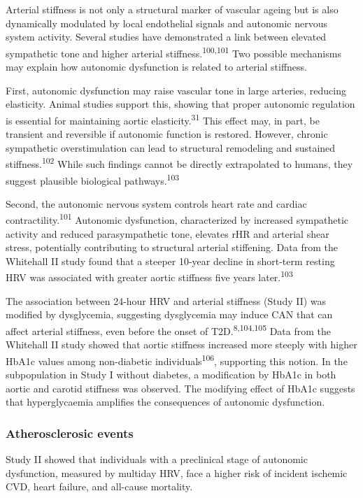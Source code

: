 \documentclass[
  a4paper,
  headsepline=true,
  open=left]{scrbook}
\begin{document}
Arterial stiffness is not only a structural marker of vascular ageing
but is also dynamically modulated by local endothelial signals and
autonomic nervous system activity. Several studies have demonstrated a
link between elevated sympathetic tone and higher arterial
stiffness.\textsuperscript{100,101} Two possible mechanisms may explain
how autonomic dysfunction is related to arterial stiffness.

First, autonomic dysfunction may raise vascular tone in large arteries,
reducing elasticity. Animal studies support this, showing that proper
autonomic regulation is essential for maintaining aortic
elasticity.\textsuperscript{31} This effect may, in part, be transient
and reversible if autonomic function is restored. However, chronic
sympathetic overstimulation can lead to structural remodeling and
sustained stiffness.\textsuperscript{102} While such findings cannot be
directly extrapolated to humans, they suggest plausible biological
pathways.\textsuperscript{103}

Second, the autonomic nervous system controls heart rate and cardiac
contractility.\textsuperscript{101} Autonomic dysfunction, characterized
by increased sympathetic activity and reduced parasympathetic tone,
elevates rHR and arterial shear stress, potentially contributing to
structural arterial stiffening. Data from the Whitehall II study found
that a steeper 10-year decline in short-term resting HRV was associated
with greater aortic stiffness five years later.\textsuperscript{103}

The association between 24-hour HRV and arterial stiffness (Study II)
was modified by dysglycemia, suggesting dysglycemia may induce CAN that
can affect arterial stiffness, even before the onset of
T2D.\textsuperscript{8,104,105} Data from the Whitehall II study showed
that aortic stiffness increased more steeply with higher HbA1c values
among non-diabetic individuals\textsuperscript{106}, supporting this
notion. In the subpopulation in Study I without diabetes, a modification
by HbA1c in both aortic and carotid stiffness was observed. The
modifying effect of HbA1c suggests that hyperglycaemia amplifies the
consequences of autonomic dysfunction.

\hypertarget{atherosclerosic-events}{%
\subsubsection{Atherosclerosic events}\label{atherosclerosic-events}}

Study II showed that individuals with a preclinical stage of autonomic
dysfunction, measured by multiday HRV, face a higher risk of incident
ischemic CVD, heart failure, and all-cause mortality.
\end{document}

